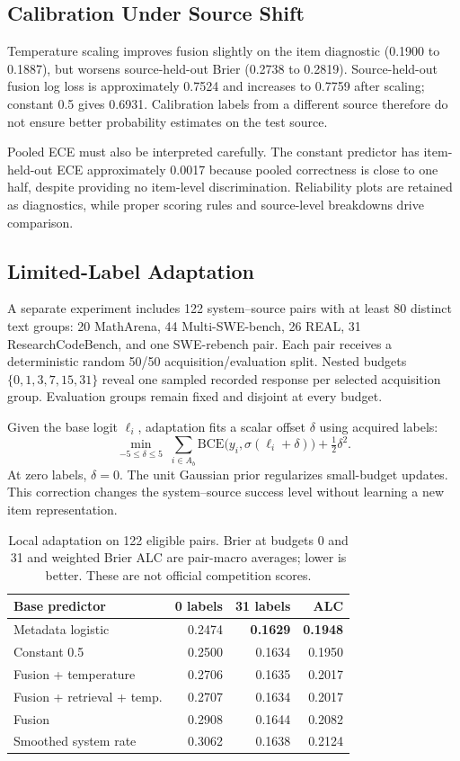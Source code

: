 \documentclass[conference]{IEEEtran}
\begin{document}
\subsection{Calibration Under Source Shift}
Temperature scaling improves fusion slightly on the item diagnostic (0.1900 to 0.1887), but worsens source-held-out Brier (0.2738 to 0.2819). Source-held-out fusion log loss is approximately 0.7524 and increases to 0.7759 after scaling; constant 0.5 gives 0.6931. Calibration labels from a different source therefore do not ensure better probability estimates on the test source.

Pooled ECE must also be interpreted carefully. The constant predictor has item-held-out ECE approximately 0.0017 because pooled correctness is close to one half, despite providing no item-level discrimination. Reliability plots are retained as diagnostics, while proper scoring rules and source-level breakdowns drive comparison.

\subsection{Limited-Label Adaptation}
A separate experiment includes 122 system--source pairs with at least 80 distinct text groups: 20 MathArena, 44 Multi-SWE-bench, 26 REAL, 31 ResearchCodeBench, and one SWE-rebench pair. Each pair receives a deterministic random 50/50 acquisition/evaluation split. Nested budgets $\{0,1,3,7,15,31\}$ reveal one sampled recorded response per selected acquisition group. Evaluation groups remain fixed and disjoint at every budget.

Given the base logit $\ell_i$, adaptation fits a scalar offset $\delta$ using acquired labels:
\begin{equation}
\min_{-5\leq\delta\leq5}\;\sum_{i\in A_b}\mathrm{BCE}\big(y_i,\sigma(\ell_i+\delta)\big)+\tfrac12\delta^2.
\end{equation}
At zero labels, $\delta=0$. The unit Gaussian prior regularizes small-budget updates. This correction changes the system--source success level without learning a new item representation.

\begin{table}[t]
\caption{Local adaptation on 122 eligible pairs. Brier at budgets 0 and 31 and weighted Brier ALC are pair-macro averages; lower is better. These are not official competition scores.}
\label{tab:adapt}\centering\small
\begin{tabular}{@{}lrrr@{}}
\toprule
Base predictor & 0 labels & 31 labels & ALC \\
\midrule
Metadata logistic & 0.2474 & \textbf{0.1629} & \textbf{0.1948} \\
Constant 0.5 & 0.2500 & 0.1634 & 0.1950 \\
Fusion + temperature & 0.2706 & 0.1635 & 0.2017 \\
Fusion + retrieval + temp. & 0.2707 & 0.1634 & 0.2017 \\
Fusion & 0.2908 & 0.1644 & 0.2082 \\
Smoothed system rate & 0.3062 & 0.1638 & 0.2124 \\
\bottomrule
\end{tabular}
\end{table}
\end{document}
